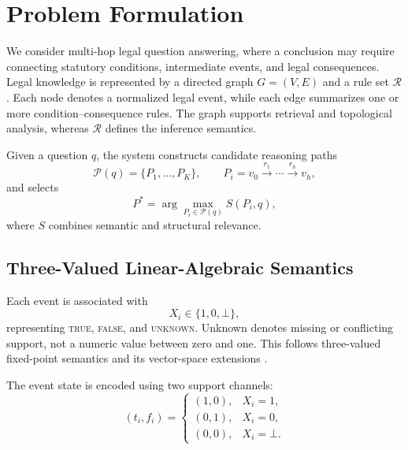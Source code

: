 \section{Problem Formulation}
\label{sec:problem_formulation}

We consider multi-hop legal question answering, where a conclusion may require
connecting statutory conditions, intermediate events, and legal consequences.
Legal knowledge is represented by a directed graph $G=(V,E)$ and a rule set
$\mathcal{R}$. Each node denotes a normalized legal event, while each edge
summarizes one or more condition--consequence rules. The graph supports
retrieval and topological analysis, whereas $\mathcal{R}$ defines the inference
semantics.

Given a question $q$, the system constructs candidate reasoning paths
\begin{equation}
\mathcal{P}(q)=\{P_1,\ldots,P_K\},\qquad
P_i=v_0\xrightarrow{r_1}\cdots\xrightarrow{r_h}v_h,
\end{equation}
and selects
\begin{equation}
P^*=\arg\max_{P_i\in\mathcal{P}(q)}S(P_i,q),
\end{equation}
where $S$ combines semantic and structural relevance.

\subsection{Three-Valued Linear-Algebraic Semantics}

Each event is associated with
\begin{equation}
X_i\in\{1,0,\bot\},
\end{equation}
representing \textsc{true}, \textsc{false}, and \textsc{unknown}. Unknown
denotes missing or conflicting support, not a numeric value between zero and
one. This follows three-valued fixed-point semantics
\cite{kleene1952metamathematics,fitting1985kripke} and its vector-space
extensions \cite{sato2020threevalued}.

The event state is encoded using two support channels:
\begin{equation}
(t_i,f_i)=
\begin{cases}
(1,0), & X_i=1,\\
(0,1), & X_i=0,\\
(0,0), & X_i=\bot.
\end{cases}
\label{eq:two_channel_state}
\end{equation}

